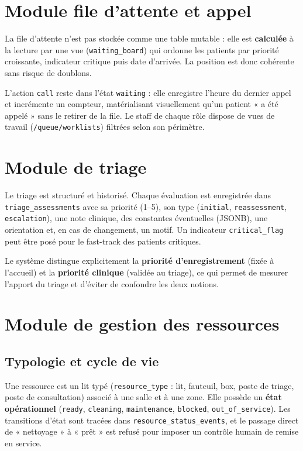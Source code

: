 \section{Module file d'attente et appel}

La file d'attente n'est pas stockée comme une table mutable : elle est \textbf{calculée} à la lecture par une vue (\texttt{waiting\_board}) qui ordonne les patients par priorité croissante, indicateur critique puis date d'arrivée. La position est donc cohérente sans risque de doublons.

L'action \texttt{call} reste dans l'état \texttt{waiting} : elle enregistre l'heure du dernier appel et incrémente un compteur, matérialisant visuellement qu'un patient « a été appelé » sans le retirer de la file. Le staff de chaque rôle dispose de vues de travail (\texttt{/queue/worklists}) filtrées selon son périmètre.

\section{Module de triage}

Le triage est structuré et historisé. Chaque évaluation est enregistrée dans \texttt{triage\_assessments} avec sa priorité (1--5), son type (\texttt{initial}, \texttt{reassessment}, \texttt{escalation}), une note clinique, des constantes éventuelles (JSONB), une orientation et, en cas de changement, un motif. Un indicateur \texttt{critical\_flag} peut être posé pour le fast-track des patients critiques.

Le système distingue explicitement la \textbf{priorité d'enregistrement} (fixée à l'accueil) et la \textbf{priorité clinique} (validée au triage), ce qui permet de mesurer l'apport du triage et d'éviter de confondre les deux notions.

\section{Module de gestion des ressources}

\subsection{Typologie et cycle de vie}

Une ressource est un lit typé (\texttt{resource\_type} : lit, fauteuil, box, poste de triage, poste de consultation) associé à une salle et à une zone. Elle possède un \textbf{état opérationnel} (\texttt{ready}, \texttt{cleaning}, \texttt{maintenance}, \texttt{blocked}, \texttt{out\_of\_service}). Les transitions d'état sont tracées dans \texttt{resource\_status\_events}, et le passage direct de « nettoyage » à « prêt » est refusé pour imposer un contrôle humain de remise en service.

